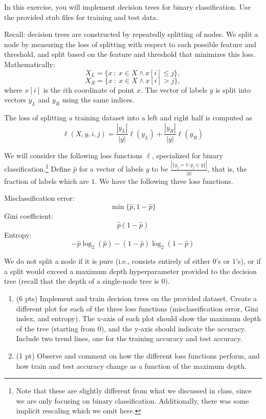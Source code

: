 \documentclass[10pt,letter,notitlepage]{article}
\newcounter{exercise}
\begin{document}


\begin{exercise}
    In this exercise, you will implement decision trees for binary classification.
  Use the provided stub files for training and test data.

  Recall: decision trees are constructed by repeatedly splitting of nodes.
  We split a node by measuring the loss of splitting with respect to each possible feature and threshold, and split based on the feature and threshold that minimizes this loss.
  Mathematically:
  \[X_L = \{x\ :\ x \in X \wedge  x[i] \leq j\},\]
  \[X_R = \{x\ :\ x \in X \wedge  x[i] > j\},\]
  where $x[i]$ is the $i$th coordinate of point $x$.
  The vector of labels $y$ is split into vectors $y_L$ and $y_R$ using the same indices.

  The loss of splitting a training dataset into a left and right half is computed as 
  \[\ell(X,y,i,j) = \frac{|y_L|}{|y|}\ell(y_L) + \frac{|y_R|}{|y|}\ell(y_R) \]

  We will consider the following loss functions $\ell$, specialized for binary classification.\footnote{Note that these are slightly different from what we discussed in class, since we are only focusing on binary classification. Additionally, there was some implicit rescaling which we omit here.}
  Define $\hat p$ for a vector of labels $y$ to be $\frac{|\{y_j = 1 : y_j \in y\}|}{|y|}$, that is, the fraction of labels which are $1$.
  We have the following three loss functions.

  \noindent Misclassification error:
  \[\min \{\hat p, 1-\hat p\}\]
  Gini coefficient:
  \[\hat p (1 - \hat p)\]
  Entropy:
  \[- \hat p \log_2 (\hat p) - (1 - \hat p) \log_2 (1 - \hat p ) \]

  We do not split a node if it is pure (i.e., consists entirely of either $0$'s or $1$'s), or if a split would exceed a maximum depth hyperparameter provided to the decision tree (recall that the depth of a single-node tree is $0$).



  \begin{enumerate}
    \item (6 pts) Implement and train decision trees on the provided dataset. Create a different plot for each of the three loss functions (misclassification error, Gini index, and entropy). The x-axis of each plot should show the maximum depth of the tree (starting from 0), and the y-axis should indicate the accuracy. Include two trend lines, one for the training accuracy and test accuracy. 
    \item (1 pt) Observe and comment on how the different loss functions perform, and how train and test accuracy change as a function of the maximum depth.
  \end{enumerate} 
\end{exercise}
\end{document}
